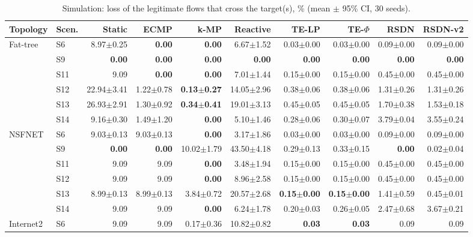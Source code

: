 \begin{table}[t]\centering\scriptsize
\caption{Simulation: loss of the legitimate flows that cross the target(s), \% (mean $\pm$ 95\% CI, 30 seeds).}\label{tab:sim_loss}
\setlength{\tabcolsep}{3pt}
\begin{tabular}{llrrrrrrrr}
\toprule
Topology & Scen. & Static & ECMP & k-MP & Reactive & TE-LP & TE-$\Phi$ & RSDN & RSDN-v2\\
\midrule
Fat-tree & S6 & 8.97$\pm$0.25 & \textbf{0.00} & \textbf{0.00} & 6.67$\pm$1.52 & 0.03$\pm$0.00 & 0.03$\pm$0.00 & 0.09$\pm$0.00 & 0.09$\pm$0.00\\
 & S9 & \textbf{0.00} & \textbf{0.00} & \textbf{0.00} & \textbf{0.00} & \textbf{0.00} & \textbf{0.00} & \textbf{0.00} & \textbf{0.00}\\
 & S11 & 9.09 & \textbf{0.00} & \textbf{0.00} & 7.01$\pm$1.44 & 0.15$\pm$0.00 & 0.15$\pm$0.00 & 0.45$\pm$0.00 & 0.45$\pm$0.00\\
 & S12 & 22.94$\pm$3.41 & 1.22$\pm$0.78 & \textbf{0.13$\pm$0.27} & 14.05$\pm$2.96 & 0.38$\pm$0.06 & 0.38$\pm$0.06 & 1.31$\pm$0.26 & 1.31$\pm$0.26\\
 & S13 & 26.93$\pm$2.91 & 1.30$\pm$0.92 & \textbf{0.34$\pm$0.41} & 19.01$\pm$3.13 & 0.45$\pm$0.05 & 0.45$\pm$0.05 & 1.70$\pm$0.38 & 1.53$\pm$0.18\\
 & S14 & 9.16$\pm$0.30 & 1.49$\pm$1.20 & \textbf{0.00} & 5.10$\pm$1.46 & 0.28$\pm$0.06 & 0.30$\pm$0.07 & 3.79$\pm$0.04 & 3.55$\pm$0.24\\
\midrule
NSFNET & S6 & 9.03$\pm$0.13 & 9.03$\pm$0.13 & \textbf{0.00} & 3.17$\pm$1.86 & 0.03$\pm$0.00 & 0.03$\pm$0.00 & 0.09$\pm$0.00 & 0.09$\pm$0.00\\
 & S9 & \textbf{0.00} & \textbf{0.00} & 10.02$\pm$1.79 & 43.50$\pm$4.18 & 0.29$\pm$0.13 & 0.33$\pm$0.15 & \textbf{0.00} & 0.02$\pm$0.04\\
 & S11 & 9.09 & 9.09 & \textbf{0.00} & 3.48$\pm$1.94 & 0.15$\pm$0.00 & 0.15$\pm$0.00 & 0.45$\pm$0.00 & 0.45$\pm$0.00\\
 & S12 & 9.09 & 9.09 & \textbf{0.00} & 8.96$\pm$2.58 & 0.15$\pm$0.00 & 0.15$\pm$0.00 & 0.45$\pm$0.00 & 0.45$\pm$0.00\\
 & S13 & 8.99$\pm$0.13 & 8.99$\pm$0.13 & 3.84$\pm$0.72 & 20.57$\pm$2.68 & \textbf{0.15$\pm$0.00} & \textbf{0.15$\pm$0.00} & 1.41$\pm$0.59 & 0.45$\pm$0.01\\
 & S14 & 9.09 & 9.09 & \textbf{0.00} & 6.24$\pm$1.78 & 0.20$\pm$0.03 & 0.26$\pm$0.05 & 2.47$\pm$0.68 & 3.67$\pm$0.21\\
\midrule
Internet2 & S6 & 9.09 & 9.09 & 0.17$\pm$0.36 & 10.82$\pm$0.82 & \textbf{0.03} & \textbf{0.03} & 0.09 & 0.09\\

\end{tabular}
\end{table}
